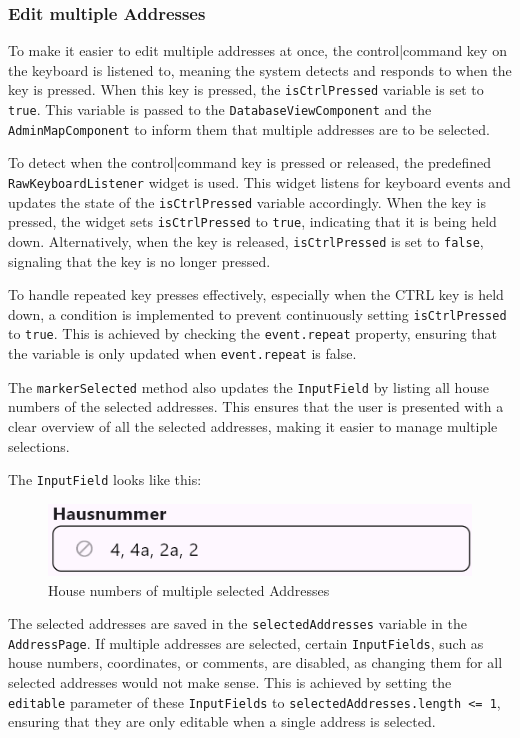 \pagebreak

\subsubsection{Edit multiple Addresses}
\label{fig:Edit multiple addresses}
To make it easier to edit multiple addresses at once, the control|command key on the keyboard is listened to, meaning the system detects and responds to when the key is pressed. When this key is pressed, the \texttt{isCtrlPressed} variable is set to \texttt{true}. This variable is passed to the \texttt{DatabaseViewComponent} and the \texttt{AdminMapComponent} to inform them that multiple addresses are to be selected.\blankLine


To detect when the control|command key is pressed or released, the predefined \texttt{RawKeyboardListener} widget is used. This widget listens for keyboard events and updates the state of the \texttt{isCtrlPressed} variable accordingly. When the key is pressed, the widget sets \texttt{isCtrlPressed} to \texttt{true}, indicating that it is being held down. Alternatively, when the  key is released, \texttt{isCtrlPressed} is set to \texttt{false}, signaling that the key is no longer pressed.

To handle repeated key presses effectively, especially when the CTRL key is held down, a condition is implemented to prevent continuously setting \texttt{isCtrlPressed} to \texttt{true}. This is achieved by checking the \texttt{event.repeat} property, ensuring that the variable is only updated when \texttt{event.repeat} is false.


The \texttt{markerSelected} method also updates the \texttt{InputField} by listing all house numbers of the selected addresses. This ensures that the user is presented with a clear overview of all the selected addresses, making it easier to manage multiple selections.

The \texttt{InputField} looks like this:
\begin{figure}[H]
    \centering
    \includegraphics[width=0.6\linewidth]{images/AdminPanel/listedHouseNumbersInputField.png}
    \caption{House numbers of multiple selected Addresses}
\end{figure}

The selected addresses are saved in the \texttt{selectedAddresses} variable in the \texttt{AddressPage}. If multiple addresses are selected, certain \texttt{InputFields}, such as house numbers, coordinates, or comments, are disabled, as changing them for all selected addresses would not make sense. This is achieved by setting the \texttt{editable} parameter of these \texttt{InputFields} to \texttt{selectedAddresses.length <= 1}, ensuring that they are only editable when a single address is selected.


